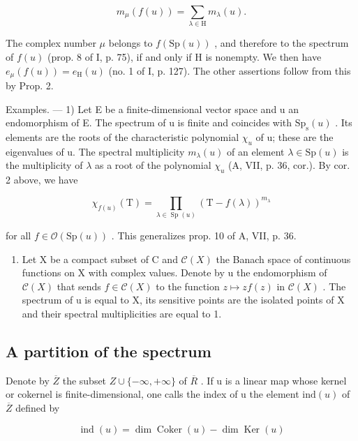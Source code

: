\[
m _ {\mu} (f (u)) = \sum_ {\lambda \in \mathrm{H}} m _ {\lambda} (u).
\]

The complex number \(\mu\) belongs to \(f(\mathrm{Sp}(u))\) , and therefore to the spectrum of \(f(u)\) (prop. 8 of I, p. 75), if and only if H is nonempty. We then have \(e_{\mu}(f(u)) = e_{\mathrm{H}}(u)\) (no. 1 of I, p. 127). The other assertions follow from this by Prop. 2.

Examples. --- 1) Let E be a finite-dimensional vector space and u an endomorphism of E. The spectrum of u is finite and coincides with \(\mathrm{Sp}_{\mathrm{s}}(u)\) . Its elements are the roots of the characteristic polynomial \(\chi_{u}\) of u; these are the eigenvalues of u. The spectral multiplicity \(m_{\lambda}(u)\) of an element \(\lambda \in \mathrm{Sp}(u)\) is the multiplicity of \(\lambda\) as a root of the polynomial \(\chi_{u}\) (A, VII, p. 36, cor.). By cor. 2 above, we have

\[
\chi_ {f (u)} (\mathrm{T}) = \prod_ {\lambda \in \operatorname{Sp} (u)} (\mathrm{T} - f (\lambda)) ^ {m _ {\lambda}}
\]

for all \(f \in \mathcal{O}(\mathrm{Sp}(u))\) . This generalizes prop. 10 of A, VII, p. 36.

\begin{enumerate}
\def\labelenumi{\arabic{enumi})}
\setcounter{enumi}{1}
\tightlist
\item
  Let X be a compact subset of C and \(\mathcal{C}(X)\) the Banach space of continuous functions on X with complex values. Denote by u the endomorphism of \(\mathcal{C}(X)\) that sends \(f \in \mathcal{C}(X)\) to the function \(z \mapsto zf(z)\) in \(\mathcal{C}(X)\) . The spectrum of u is equal to X, its sensitive points are the isolated points of X and their spectral multiplicities are equal to 1.
\end{enumerate}

\subsection{A partition of the spectrum}

Denote by \(\overline{Z}\) the subset \(Z \cup \{-\infty, +\infty\}\) of \(\overline{R}\) . If u is a linear map whose kernel or cokernel is finite-dimensional, one calls the index of u the element \(\text{ind}(u)\) of \(\overline{Z}\) defined by

\[
\operatorname{ind} (u) = \dim \operatorname{Coker} (u) - \dim \operatorname{Ker} (u)
\]

